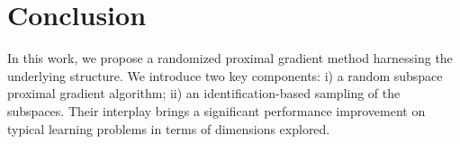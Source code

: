 \section{Conclusion}\label{sec:mor-conclusion}
{In this work, we propose a randomized proximal gradient method harnessing the underlying structure. We introduce two key components: i) a random subspace proximal gradient algorithm; ii) an identification-based sampling of the subspaces. Their interplay brings a significant performance improvement on typical learning problems in terms of dimensions explored.
}